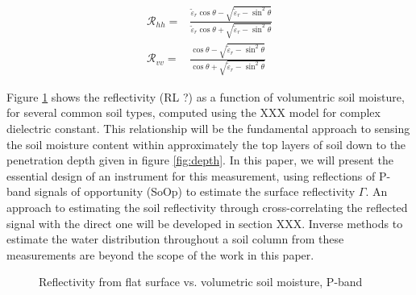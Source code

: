 \documentclass[draftcls,onecolumn]{IEEEtran}  %
\begin{document}
\begin{equation} 
\begin{split}
	{\mathcal{R}_{hh}} = {}& \frac{{{{\tilde \varepsilon }_r}\cos \theta  - \sqrt 				{{{\tilde \varepsilon }_r} - {{\sin }^2}\theta } }}{{{{\tilde \varepsilon}_r}				\cos \theta  + \sqrt {{{\tilde \varepsilon }_r} - {{\sin }^2}\theta }}}
\\
	{\mathcal{R}_{vv}} = {}& \frac{{\cos \theta  - \sqrt {{{\tilde \varepsilon }_r} - {{\sin }^2}\theta } }}{{\cos \theta  + \sqrt {{{\tilde \varepsilon }_r} - {{\sin }^2}\theta }}} 
    \end{split}
     \label{Eq: reflectivity_di}
\end{equation}

Figure \ref{fig:reflectivity} shows the reflectivity (RL ?) as a function of volumentric soil moisture, for several common soil types, computed using the XXX model for complex dielectric constant.   This relationship will be the fundamental approach to sensing the soil moisture content within approximately the top layers of soil down to the penetration depth given in figure \ref{fig:depth}.
In this paper, we will present the essential design of an instrument for this measurement, using reflections of P-band signals of opportunity (SoOp) to estimate the surface reflectivity $\Gamma$. 
An approach to estimating the soil reflectivity through cross-correlating the reflected signal with the direct one will be developed in section XXX. 
Inverse methods to estimate the water distribution throughout a soil column from these measurements are beyond the scope of the work in this paper.  

\begin{figure}[!t]
	\centering
	\caption{Reflectivity from flat surface vs. volumetric soil moisture, P-band}
    \centering
	\label{fig:reflectivity}
\end{figure}
\end{document}
